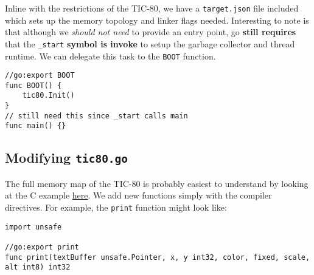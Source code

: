 \documentclass{article}
\begin{document}
Inline with the restrictions of the TIC-80, we have a \lstinline|target.json| file included which sets up the memory topology and linker flags needed. Interesting to note is that although we \textit{should not need} to provide an entry point, go \textbf{still requires} that the \lstinline|_start| \textbf{symbol is invoke} to setup the garbage collector and thread runtime. We can delegate this task to the \lstinline|BOOT| function.
\\
\begin{lstlisting}
//go:export BOOT
func BOOT() {
    tic80.Init()
}
// still need this since _start calls main
func main() {}
\end{lstlisting}

\subsection{Modifying \texttt{tic80.go}}

The full memory map of the TIC-80 is probably easiest to understand by looking at the C example \href{https://github.com/nesbox/TIC-80/blob/main/templates/c/src/tic80.h}{here}. We add new functions simply with the compiler directives. For example, the \lstinline|print| function might look like:
\\
\begin{lstlisting}
import unsafe

//go:export print
func print(textBuffer unsafe.Pointer, x, y int32, color, fixed, scale, alt int8) int32
\end{lstlisting}
\end{document}
